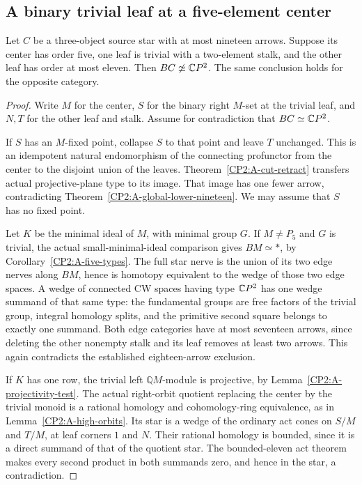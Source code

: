 \subsection{A binary trivial leaf at a five-element center}

\begin{theorem}
\label{CP2:A-five-center-binary-trivial-leaf-nineteen}
Let $C$ be a three-object source star with at most nineteen arrows.
Suppose its center has order five, one leaf is trivial with a
two-element stalk, and the other leaf has order at most eleven.
Then $BC\not\simeq\mathbb{C}P^2$. The same conclusion holds for the
opposite category.
\end{theorem}
\begin{proof}
Write $M$ for the center, $S$ for the binary right $M$-set at
the trivial leaf, and $N,T$ for the other leaf and stalk.
Assume for contradiction that $BC\simeq\mathbb{C}P^2$.

If $S$ has an $M$-fixed point, collapse $S$ to that point and
leave $T$ unchanged. This is an idempotent natural endomorphism
of the connecting profunctor from the center to the disjoint
union of the leaves. Theorem~\ref{CP2:A-cut-retract} transfers
actual projective-plane type to its image. That image has one
fewer arrow, contradicting Theorem~\ref{CP2:A-global-lower-nineteen}.
We may assume that $S$ has no fixed point.

Let $K$ be the minimal ideal of $M$, with minimal group $G$.
If $M\ne P_5$ and $G$ is trivial, the actual small-minimal-ideal
comparison gives $BM\simeq *$, by
Corollary~\ref{CP2:A-five-types}. The full star nerve is the
union of its two edge nerves along $BM$, hence is homotopy
equivalent to the wedge of those two edge spaces. A wedge of
connected CW spaces having type $\mathbb{C}P^2$ has one wedge summand
of that same type: the fundamental groups are free factors of
the trivial group, integral homology splits, and the primitive
second square belongs to exactly one summand. Both edge
categories have at most seventeen arrows, since deleting the
other nonempty stalk and its leaf removes at least two arrows.
This again contradicts the established eighteen-arrow exclusion.

If $K$ has one row, the trivial left $\mathbb QM$-module is
projective, by Lemma~\ref{CP2:A-projectivity-test}. The actual
right-orbit quotient replacing the center by the trivial monoid
is a rational homology and cohomology-ring equivalence, as in
Lemma~\ref{CP2:A-high-orbits}. Its star is a wedge of the ordinary
act cones on $S/M$ and $T/M$, at leaf corners $1$ and $N$.
Their rational homology is bounded, since it is a direct
summand of that of the quotient star. The bounded-eleven act
theorem makes every second product in both summands zero,
and hence in the star, a contradiction.


\end{proof}

